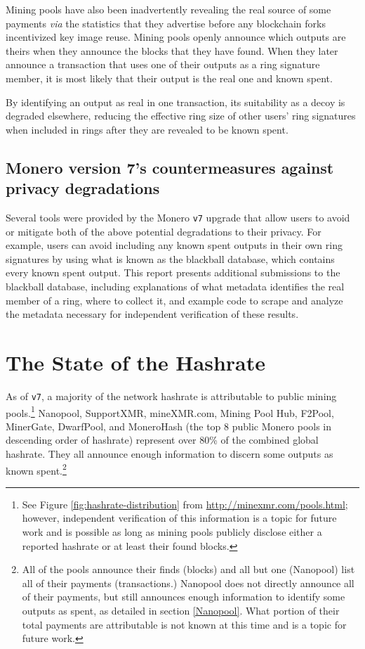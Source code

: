 \documentclass[notitlepage]{report}
\begin{document}
Mining pools have also been inadvertently revealing the real source of some payments \textit{via} the statistics that they advertise before any blockchain forks incentivized key image reuse.  Mining pools openly announce which outputs are theirs when they announce the blocks that they have found.  When they later announce a transaction that uses one of their outputs as a ring signature member, it is most likely that their output is the real one and known spent.

By identifying an output as real in one transaction, its suitability as a decoy is degraded elsewhere, reducing the effective ring size of other users' ring signatures when included in rings after they are revealed to be known spent.

\subsection{Monero version 7's countermeasures against privacy degradations}

Several tools were provided by the Monero \verb/v7/ upgrade that allow users to avoid or mitigate both of the above potential degradations to their privacy.  For example, users can avoid including any known spent outputs in their own ring signatures by using what is known as the blackball database, which contains every known spent output.  This report presents additional submissions to the blackball database, including explanations of what metadata identifies the real member of a ring, where to collect it, and example code to scrape and analyze the metadata necessary for independent verification of these results.

\section{The State of the Hashrate}
\setcounter{chapter}{2}

As of \verb/v7/, a majority of the network hashrate is attributable to public mining pools.\footnote{See Figure \ref{fig:hashrate-distribution} from \url{http://minexmr.com/pools.html}; however, independent verification of this information is a topic for future work and is possible as long as mining pools publicly disclose either a reported hashrate or at least their found blocks.}  Nanopool, SupportXMR, mineXMR.com, Mining Pool Hub, F2Pool, MinerGate, DwarfPool, and MoneroHash (the top 8 public Monero pools in descending order of hashrate) represent over 80\% of the combined global hashrate.  They all announce enough information to discern some outputs as known spent.\footnote{All of the pools announce their finds (blocks) and all but one (Nanopool) list all of their payments (transactions.)  Nanopool does not directly announce all of their payments, but still announces enough information to identify some outputs as spent, as detailed in section \ref{Nanopool}.  What portion of their total payments are attributable is not known at this time and is a topic for future work.}
\end{document}
